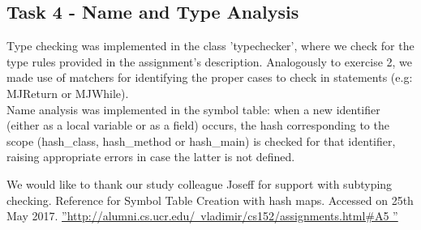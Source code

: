\documentclass[paper=a4, fontsize=11pt]{scrartcl}
\numberwithin{equation}{section}		%
\numberwithin{figure}{section}			%
\numberwithin{table}{section}				%
\begin{document}
\subsection*{Task 4 - Name and Type Analysis}
Type checking was implemented in the class 'typechecker', where we check for the type rules provided in the assignment's description. Analogously to exercise 2, we made use of matchers for identifying the proper cases to check in statements (e.g: MJReturn or MJWhile). \\
Name analysis was implemented in the symbol table: when a new identifier (either as a local variable or as a field) occurs, the hash corresponding to the scope (hash\_class, hash\_method or hash\_main) is checked for that identifier, raising appropriate errors in case the latter is not defined. 





\begin{thebibliography}{9}%
We would like to thank our study colleague Joseff for support with subtyping checking. 
Reference for Symbol Table Creation with hash maps. Accessed on 25th May 2017.
\hyperref[label_name]{''http://alumni.cs.ucr.edu/~vladimir/cs152/assignments.html\#A5
''}

\end{thebibliography}
\end{document}
